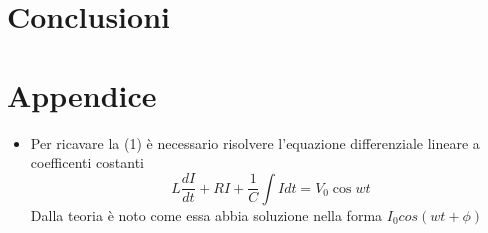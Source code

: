\documentclass{article}
\begin{document}
\section{Conclusioni}
\section{Appendice}
\begin{itemize}
  \item Per ricavare la (1) è necessario risolvere l'equazione differenziale lineare a coefficenti costanti
$$
L\frac{dI}{dt}+RI+\frac{1}{C}\int{Idt}=V_0\cos{wt}
$$  
Dalla teoria è noto come essa abbia soluzione nella forma $I_0cos(wt +\phi)$
  
\end{itemize}
\end{document}
